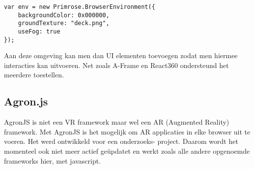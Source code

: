 \begin{lstlisting}[frame=single, caption=Voorbeeld van primrose omgeving]
var env = new Primrose.BrowserEnvironment({
	backgroundColor: 0x000000,
	groundTexture: "deck.png",
	useFog: true
});
\end{lstlisting}

Aan deze omgeving kan men dan UI elementen toevoegen zodat men hiermee interacties kan uitvoeren. Net zoals A-Frame en React360 ondersteund het meerdere toestellen.

\subsection{Agron.js}
\label{subsec:agron.js}
AgronJS is niet een VR framework maar wel een AR (Augmented Reality) framework. Met AgronJS is het mogelijk om AR applicaties in elke browser uit te voeren. Het werd ontwikkeld voor een onderzoeks- project. Daarom wordt het momenteel ook niet meer actief geüpdatet en werkt zoals alle andere opgenoemde frameworks hier, met javascript.



